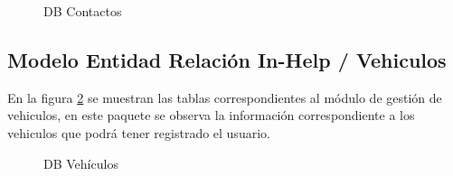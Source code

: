 \begin{figure}[htbp!]
	\centering
	\caption{DB Contactos}
	\label{fig:BD_Contactos}
\end{figure}
\subsection{Modelo Entidad Relación In-Help / Vehiculos}
En la figura \ref{fig:BD_Vehiculo} se muestran las tablas correspondientes al módulo de gestión de vehiculos, en este paquete se observa la información correspondiente a los vehiculos que podrá tener registrado el usuario.
\begin{figure}[htbp!]
	\centering
	\caption{DB Vehículos}
	\label{fig:BD_Vehiculo}
\end{figure}
